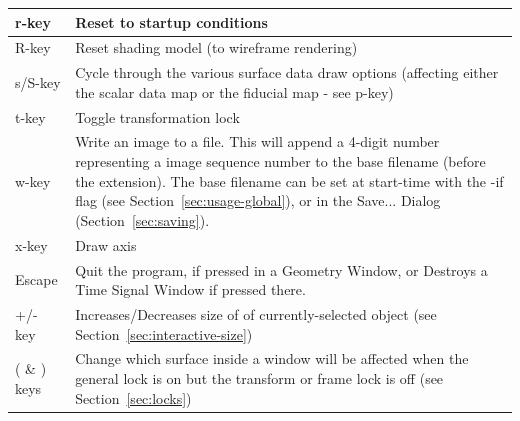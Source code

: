 \begin{table}[htbp]
\begin{center}
\begin{tabular}{|l|p{6in}|}
        r-key   &       Reset to startup conditions \\ \hline
        R-key   &       Reset shading model (to wireframe rendering) \\ \hline
        s/S-key   &      Cycle through the various surface data draw 
        options (affecting either the scalar data map or the fiducial map - see p-key)\\ \hline
        t-key   &       Toggle transformation lock \\ \hline
        w-key   &       Write an image to a file.  This will append a 4-digit 
                        number representing a image sequence number to the 
                        base filename (before the extension).  The base 
                        filename can be set at start-time with the -if flag 
                        (see Section~\ref{sec:usage-global}), or in the 
                        Save... Dialog (Section~\ref{sec:saving}).  \\ \hline
        x-key   &       Draw axis \\ \hline
        Escape  &       Quit the program, if pressed in a Geometry Window, 
            or Destroys a Time Signal Window if pressed there. \\ \hline
        +/- key   &    Increases/Decreases size of of currently-selected object
       (see Section~\ref{sec:interactive-size})\\ \hline
       ( \& ) keys   &  Change which surface inside a window will be affected
            when the general lock is on but the transform or frame lock is off
            (see Section~\ref{sec:locks})\\ \hline
\end{tabular}
\end{center}

\end{table} 

